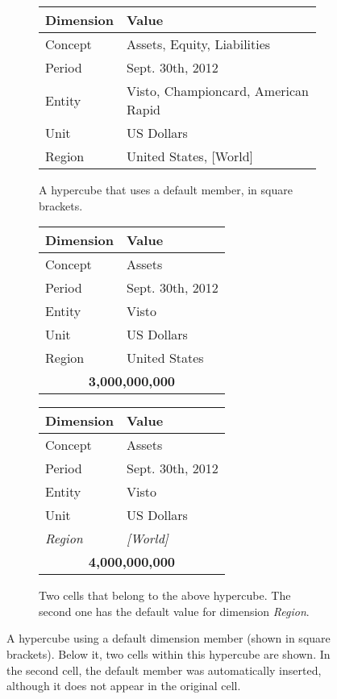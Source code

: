 \documentclass{acm_proc_article-sp}
\begin{document}
\begin{figure}
\centering
\begin{subfigure}[c]{\columnwidth}
\begin{tabular}{ll}
\hline
\hline
Dimension & Value \\
\hline
Concept & Assets, Equity, Liabilities \\
Period & Sept. 30th, 2012 \\
Entity & Visto, Championcard, American Rapid \\
Unit & US Dollars \\
Region & United States, [World] \\
\hline
\end{tabular}
\caption{A hypercube that uses a default member, in square brackets.}
\end{subfigure}
\begin{subfigure}[c]{\columnwidth}
\centering
\begin{tabular}{ll}
\hline
\hline
Dimension & Value \\
\hline
Concept & Assets \\
Period & Sept. 30th, 2012 \\
Entity & Visto \\
Unit & US Dollars \\
Region & United States \\
\hline
\multicolumn{2}{c}{\textbf{3,000,000,000}} \\
\hline
\end{tabular}
\begin{tabular}{ll}
\hline
\hline
Dimension & Value \\
\hline
Concept & Assets \\
Period & Sept. 30th, 2012 \\
Entity & Visto \\
Unit & US Dollars \\
\emph{Region} & \emph{[World]} \\
\hline
\multicolumn{2}{c}{\textbf{4,000,000,000}} \\
\hline
\end{tabular}
\caption{Two cells that belong to the above hypercube. The second one has the default value for dimension \emph{Region}.}
\end{subfigure}
\vspace{5pt}
\caption{A hypercube using a default dimension member (shown in square brackets). Below it, two cells within this hypercube are shown. In the second cell, the default member was automatically inserted, although it does not appear in the original cell.}
\label{fig-default}
\vspace{3mm}
\end{figure}
\end{document}
